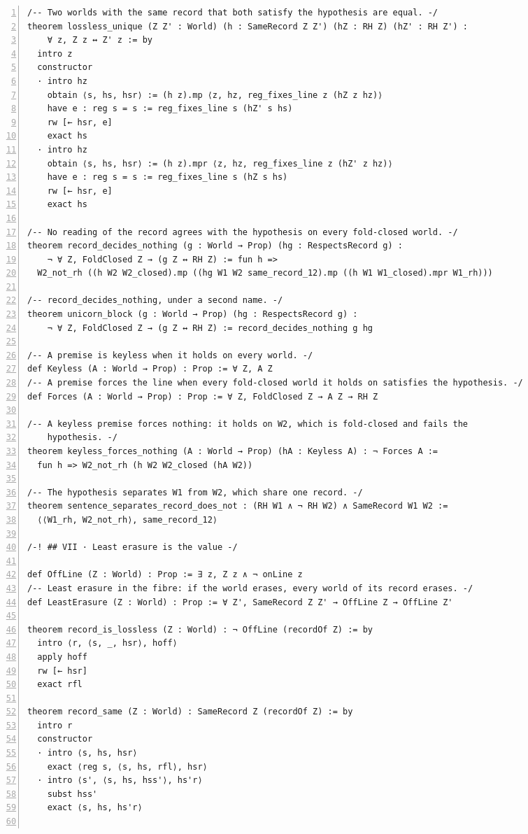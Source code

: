 \documentclass[10pt]{article}
\newcommand{\leansize}{\fontsize{5.5pt}{6.75pt}\selectfont}
\begin{document}
\begin{multicols}{2}
\begin{Verbatim}[numbers=left,firstnumber=1,numbersep=3pt,xleftmargin=2.6em,breaklines=true,breakanywhere=true,breakautoindent=false,breakindent=1.4em,breaksymbolleft={},breakanywheresymbolpre={},fontsize=\leansize]
/-- Two worlds with the same record that both satisfy the hypothesis are equal. -/
theorem lossless_unique (Z Z' : World) (h : SameRecord Z Z') (hZ : RH Z) (hZ' : RH Z') :
    ∀ z, Z z ↔ Z' z := by
  intro z
  constructor
  · intro hz
    obtain ⟨s, hs, hsr⟩ := (h z).mp ⟨z, hz, reg_fixes_line z (hZ z hz)⟩
    have e : reg s = s := reg_fixes_line s (hZ' s hs)
    rw [← hsr, e]
    exact hs
  · intro hz
    obtain ⟨s, hs, hsr⟩ := (h z).mpr ⟨z, hz, reg_fixes_line z (hZ' z hz)⟩
    have e : reg s = s := reg_fixes_line s (hZ s hs)
    rw [← hsr, e]
    exact hs

/-- No reading of the record agrees with the hypothesis on every fold-closed world. -/
theorem record_decides_nothing (g : World → Prop) (hg : RespectsRecord g) :
    ¬ ∀ Z, FoldClosed Z → (g Z ↔ RH Z) := fun h =>
  W2_not_rh ((h W2 W2_closed).mp ((hg W1 W2 same_record_12).mp ((h W1 W1_closed).mpr W1_rh)))

/-- record_decides_nothing, under a second name. -/
theorem unicorn_block (g : World → Prop) (hg : RespectsRecord g) :
    ¬ ∀ Z, FoldClosed Z → (g Z ↔ RH Z) := record_decides_nothing g hg

/-- A premise is keyless when it holds on every world. -/
def Keyless (A : World → Prop) : Prop := ∀ Z, A Z
/-- A premise forces the line when every fold-closed world it holds on satisfies the hypothesis. -/
def Forces (A : World → Prop) : Prop := ∀ Z, FoldClosed Z → A Z → RH Z

/-- A keyless premise forces nothing: it holds on W2, which is fold-closed and fails the
    hypothesis. -/
theorem keyless_forces_nothing (A : World → Prop) (hA : Keyless A) : ¬ Forces A :=
  fun h => W2_not_rh (h W2 W2_closed (hA W2))

/-- The hypothesis separates W1 from W2, which share one record. -/
theorem sentence_separates_record_does_not : (RH W1 ∧ ¬ RH W2) ∧ SameRecord W1 W2 :=
  ⟨⟨W1_rh, W2_not_rh⟩, same_record_12⟩

/-! ## VII · Least erasure is the value -/

def OffLine (Z : World) : Prop := ∃ z, Z z ∧ ¬ onLine z
/-- Least erasure in the fibre: if the world erases, every world of its record erases. -/
def LeastErasure (Z : World) : Prop := ∀ Z', SameRecord Z Z' → OffLine Z → OffLine Z'

theorem record_is_lossless (Z : World) : ¬ OffLine (recordOf Z) := by
  intro ⟨r, ⟨s, _, hsr⟩, hoff⟩
  apply hoff
  rw [← hsr]
  exact rfl

theorem record_same (Z : World) : SameRecord Z (recordOf Z) := by
  intro r
  constructor
  · intro ⟨s, hs, hsr⟩
    exact ⟨reg s, ⟨s, hs, rfl⟩, hsr⟩
  · intro ⟨s', ⟨s, hs, hss'⟩, hs'r⟩
    subst hss'
    exact ⟨s, hs, hs'r⟩


\end{Verbatim}
\end{multicols}
\end{document}
